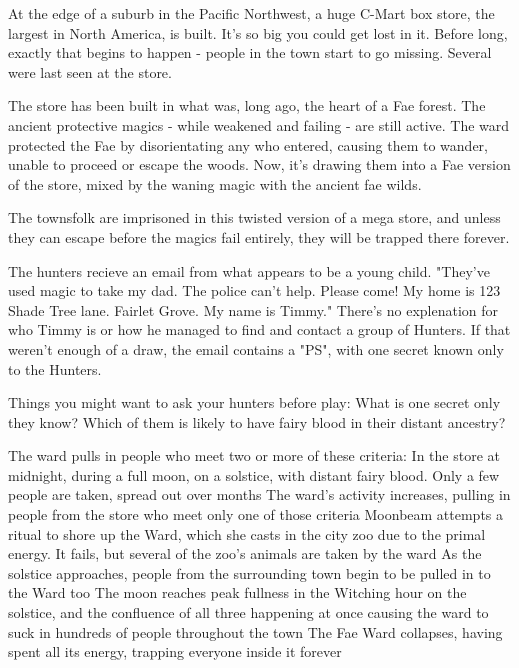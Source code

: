 \documentclass{motw}
\begin{document}




At the edge of a suburb in the Pacific Northwest, a huge C-Mart box store, the largest in North America, is built.  It's so big you could get lost in it.  Before long, exactly that begins to happen - people in the town start to go missing.  Several were last seen at the store.

The store has been built in what was, long ago, the heart of a Fae forest. The ancient protective magics - while weakened and failing - are still active.  The ward protected the Fae by disorientating any who entered, causing them to wander, unable to proceed or escape the woods.  Now, it's drawing them into a Fae version of the store, mixed by the waning magic with the ancient fae wilds.

The townsfolk are imprisoned in this twisted version of a mega store, and unless they can escape before the magics fail entirely, they will be trapped there forever.


The hunters recieve an email from what appears to be a young child. "They've used magic to take my dad.  The police can't help.  Please come! My home is 123 Shade Tree lane. Fairlet Grove. My name is Timmy."  There's no explenation for who Timmy is or how he managed to find and contact a group of Hunters.  If that weren't enough of a draw, the email contains a "PS", with one secret known only to the Hunters.


Things you might want to ask your hunters before play:  What is one secret only they know?  Which of them is likely to have fairy blood in their distant ancestry?

\Countdown%
{The ward pulls in people who meet two or more of these criteria: In the store at midnight, during a full moon, on a solstice, with distant fairy blood.  Only a few people are taken, spread out over months}
{The ward's activity increases, pulling in people from the store who meet only one of those criteria}
{Moonbeam attempts a ritual to shore up the Ward, which she casts in the city zoo due to the primal energy.  It fails, but several of the zoo's animals are taken by the ward}
{As the solstice approaches, people from the surrounding town begin to be pulled in to the Ward too}
{The moon reaches peak fullness in the Witching hour on the solstice, and the confluence of all three happening at once causing the ward to suck in hundreds of people throughout the town}
{The Fae Ward collapses, having spent all its energy, trapping everyone inside it forever}
\end{document}

